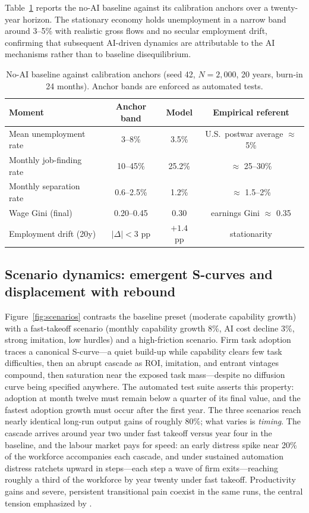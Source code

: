 \documentclass[11pt,a4paper]{article}
\begin{document}
Table~\ref{tab:calibration} reports the no-AI baseline against its calibration anchors
over a twenty-year horizon. The stationary economy holds unemployment in a narrow band
around 3--5\% with realistic gross flows and no secular employment drift, confirming
that subsequent AI-driven dynamics are attributable to the AI mechanisms rather than to
baseline disequilibrium.

\begin{table}[t]
\centering
\caption{No-AI baseline against calibration anchors (seed 42, $N=2{,}000$, 20 years,
burn-in 24 months). Anchor bands are enforced as automated tests.}
\label{tab:calibration}
\begin{tabular}{@{}lccc@{}}
\toprule
\textbf{Moment} & \textbf{Anchor band} & \textbf{Model} & \textbf{Empirical referent} \\
\midrule
Mean unemployment rate & 3--8\% & 3.5\% & U.S.\ postwar average $\approx$ 5\% \\
Monthly job-finding rate & 10--45\% & 25.2\% & $\approx$ 25--30\% \citep{pissarides2000equilibrium} \\
Monthly separation rate & 0.6--2.5\% & 1.2\% & $\approx$ 1.5--2\% \\
Wage Gini (final) & 0.20--0.45 & 0.30 & earnings Gini $\approx$ 0.35 \\
Employment drift (20y) & $|\Delta| < 3$ pp & $+1.4$ pp & stationarity \\
\bottomrule
\end{tabular}
\end{table}

\subsection{Scenario dynamics: emergent S-curves and displacement with rebound}

Figure~\ref{fig:scenarios} contrasts the baseline preset (moderate capability growth)
with a fast-takeoff scenario (monthly capability growth 8\%, AI cost decline 3\%, strong
imitation, low hurdles) and a high-friction scenario. Firm task adoption traces a
canonical S-curve---a quiet build-up while capability clears few task difficulties,
then an abrupt cascade as ROI, imitation, and entrant vintages compound, then
saturation near the exposed task mass---despite no diffusion curve being specified
anywhere. The automated test suite asserts this property: adoption at month twelve must
remain below a quarter of its final value, and the fastest adoption growth must occur
after the first year. The three scenarios reach nearly identical long-run output gains
of roughly 80\%; what varies is \emph{timing}. The cascade arrives around year two
under fast takeoff versus year four in the baseline, and the labour market pays for
speed: an early distress spike near 20\% of the workforce accompanies each cascade, and
under sustained automation distress ratchets upward in steps---each step a wave of firm
exits---reaching roughly a third of the workforce by year twenty under fast takeoff.
Productivity gains and severe, persistent transitional pain coexist in the same runs,
the central tension emphasized by \citet{korinek2024policy}.
\end{document}
